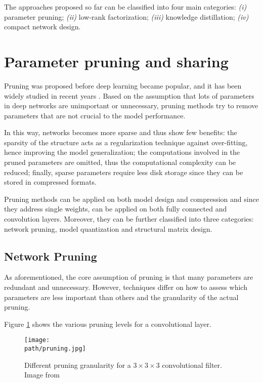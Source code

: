 \newline 
The approaches proposed so far can be classified into four main categories: \emph{(i)} parameter pruning; \emph{(ii)} low-rank factorization; \emph{(iii)} knowledge distillation; \emph{(iv)} compact network design.


\section{Parameter pruning and sharing}
Pruning was proposed before deep learning became popular, and it has been widely studied in recent years \parencite{brain}. Based on the assumption that lots of parameters in deep networks are unimportant or unnecessary, pruning methods try to remove parameters that are not crucial to the model performance. 
\newline 

In this way, networks becomes more sparse and thus show few benefits: the sparsity of the structure acts as a regularization technique against over-fitting, hence improving the model generalization; the computations involved in the pruned parameters are omitted, thus the computational complexity can be reduced; finally, sparse parameters require less disk storage since they can be stored in compressed formats. 
\newline 

Pruning methods can be applied on both model design and compression and since they address single weights, can be applied on both fully connected and convolution layers. Moreover, they can be further classified into three categories: network pruning, model quantization and structural matrix design.  

\subsection{Network Pruning}
\label{subsec:pruning}
As aforementioned, the core assumption of pruning is that many parameters are redundant and unnecessary. However, techniques differ on how to assess which parameters are less important than others and the granularity of the actual pruning. 

Figure \ref{fig:pruning} shows the various pruning levels for a convolutional layer.

\begin{figure}[h!]
 \centering
 \texttt{[image: \\path/pruning.jpg]} 
 \caption{Different pruning granularity for a $3 \times 3 \times 3$ convolutional filter. Image from \parencite{survey2018}}
 \label{fig:pruning}
\end{figure}

